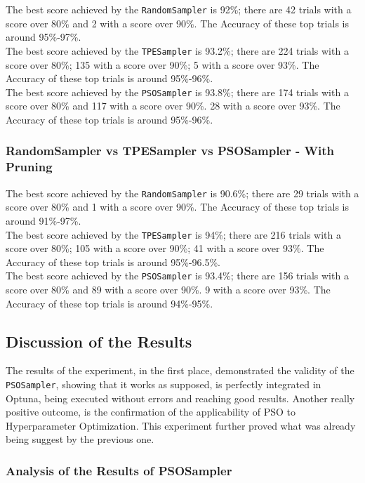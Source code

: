The best score achieved by the \texttt{RandomSampler} is 92\%; there are 42 trials with a score over 80\% and 2 with a score over 90\%. The Accuracy of these top trials is around 95\%-97\%.
\\[0.3cm]The best score achieved by the \texttt{TPESampler} is 93.2\%; there are 224 trials with a score over 80\%; 135 with a score over 90\%; 5 with a score over 93\%. The Accuracy of these top trials is around 95\%-96\%.
\\[0.3cm]The best score achieved by the \texttt{PSOSampler} is 93.8\%; there are 174 trials with a score over 80\% and 117 with a score over 90\%. 28 with a score over 93\%. The Accuracy of these top trials is around 95\%-96\%.

\subsubsection{RandomSampler  vs  TPESampler  vs  PSOSampler  -  With Pruning}

The best score achieved by the \texttt{RandomSampler} is 90.6\%; there are 29 trials with a score over 80\% and 1 with a score over 90\%. The Accuracy of these top trials is around 91\%-97\%.
\\[0.3cm]The best score achieved by the \texttt{TPESampler} is 94\%; there are 216 trials with a score over 80\%; 105 with a score over 90\%; 41 with a score over 93\%. The Accuracy of these top trials is around 95\%-96.5\%.
\\[0.3cm]The best score achieved by the \texttt{PSOSampler} is 93.4\%; there are 156 trials with a score over 80\% and 89 with a score over 90\%. 9 with a score over 93\%. The Accuracy of these top trials is around 94\%-95\%.

\subsection{Discussion of the Results}

The results of the experiment, in the first place, demonstrated the validity of the \texttt{PSOSampler}, showing that it works as supposed, is perfectly integrated in Optuna, being executed without errors and reaching good results.
Another really positive outcome, is the confirmation of the applicability of PSO to Hyperparameter Optimization. This experiment further proved what was already being suggest by the previous one. 

\subsubsection{Analysis of the Results of PSOSampler}

